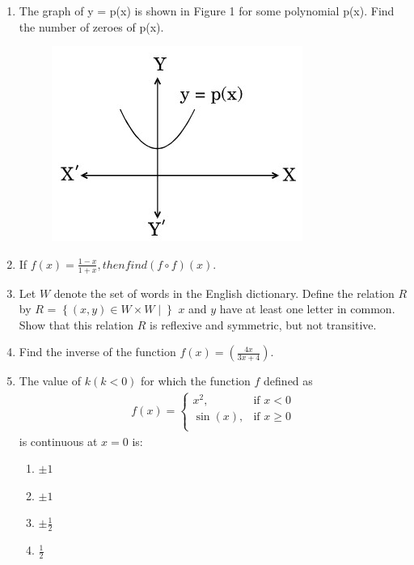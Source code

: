 \documentclass{article}
\providecommand{\cbrak}[1]{\ensuremath{\left\{#1\right\}}}
\begin{document}
\begin{enumerate}

\item The graph of y = p(x) is shown in Figure 1 for some polynomial p(x). Find the number of zeroes of p(x).

\begin{figure}[h]
\centering
\includegraphics[width=0.4\columnwidth]{ques8.jpg}
\caption{}
\label{fig:my_label}
\end{figure}

\item If $f(x) = \frac{1-x}{1+x}, then find (f\circ f)(x)$.


\item Let $W$ denote the set of words in the English dictionary. Define the relation $R$ by
$R$ = $\cbrak{(x, y) \in W \times W \mid}$ $x$ and $y$ have at least one letter in common.
Show that this relation $R$ is reflexive and symmetric, but not transitive.

\item Find the inverse of the function $f(x) = (\frac{4x}{3x+4})$.

\item The value of $k(k < 0)$ for which the function $f$ defined as 
\begin{align*}
f(x) = \begin{cases}
x^2, & \text{if } x < 0 \\
\sin(x), & \text{if } x \geq 0  \\
\end{cases}
\end{align*}
is continuous at $x = 0$ is:

\begin{enumerate}
     \item $\pm1$ 

     \item $\pm1$ 

     \item  $\pm\frac{1}{2}$ 

     \item  $\frac{1}{2}$ 


\end{enumerate}
\end{enumerate}
\end{document}
